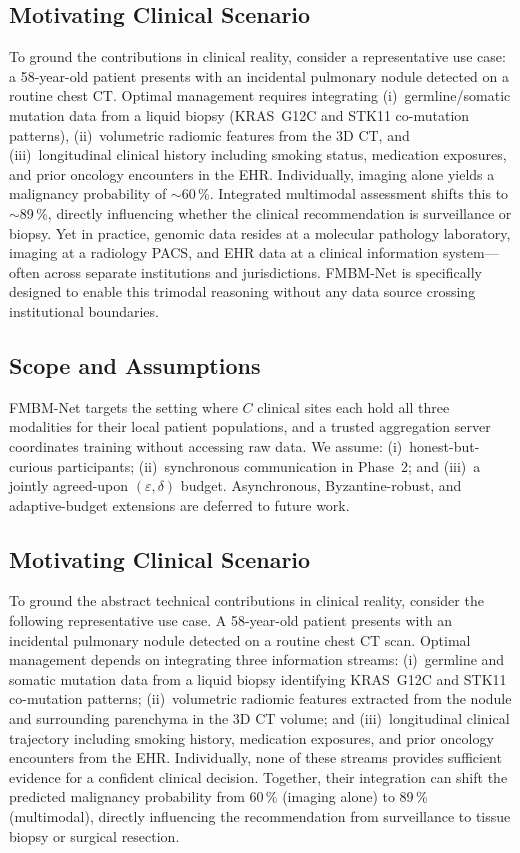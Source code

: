 \documentclass[a4paper,fleqn]{cas-dc}
\begin{document}
\subsection{Motivating Clinical Scenario}

To ground the contributions in clinical reality, consider a representative
use case: a 58-year-old patient presents with an incidental pulmonary nodule
detected on a routine chest CT. Optimal management requires integrating
(i)~germline/somatic mutation data from a liquid biopsy
(KRAS~G12C and STK11 co-mutation patterns),
(ii)~volumetric radiomic features from the 3D CT, and
(iii)~longitudinal clinical history including smoking status, medication
exposures, and prior oncology encounters in the EHR. Individually, imaging
alone yields a malignancy probability of $\sim$60\,\%. Integrated multimodal
assessment shifts this to $\sim$89\,\%, directly influencing whether the
clinical recommendation is surveillance or biopsy. Yet in practice, genomic
data resides at a molecular pathology laboratory, imaging at a radiology
PACS, and EHR data at a clinical information system---often across separate
institutions and jurisdictions. FMBM-Net is specifically designed to enable
this trimodal reasoning without any data source crossing institutional
boundaries.

\subsection{Scope and Assumptions}

FMBM-Net targets the setting where $C$ clinical sites each hold all three
modalities for their local patient populations, and a trusted aggregation
server coordinates training without accessing raw data. We assume:
(i)~honest-but-curious participants; (ii)~synchronous communication in
Phase~2; and (iii)~a jointly agreed-upon $(\varepsilon,\delta)$ budget.
Asynchronous, Byzantine-robust, and adaptive-budget extensions are deferred
to future work.

\subsection{Motivating Clinical Scenario}

To ground the abstract technical contributions in clinical reality, consider
the following representative use case. A 58-year-old patient presents with an
incidental pulmonary nodule detected on a routine chest CT scan. Optimal
management depends on integrating three information streams: (i)~germline and
somatic mutation data from a liquid biopsy identifying KRAS~G12C and STK11
co-mutation patterns; (ii)~volumetric radiomic features extracted from the
nodule and surrounding parenchyma in the 3D CT volume; and (iii)~longitudinal
clinical trajectory including smoking history, medication exposures, and
prior oncology encounters from the EHR. Individually, none of these streams
provides sufficient evidence for a confident clinical decision. Together,
their integration can shift the predicted malignancy probability from
60\,\% (imaging alone) to 89\,\% (multimodal), directly influencing the
recommendation from surveillance to tissue biopsy or surgical resection.
\end{document}
